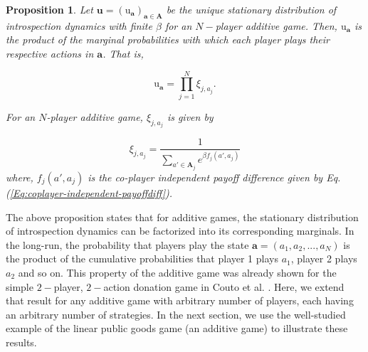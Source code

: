 \documentclass[11pt]{article}
\theoremstyle{plainCl1}
\newtheorem{Prop}{Proposition}
\theoremstyle{plainCl2}
\newcommand{\A}{\mathbf{A}}
\newcommand{\abf}{\mathbf{a}}
\newcommand{\ubf}{\mathbf{u}}
\begin{document}
\begin{Prop}
Let $\ubf = (\mathrm{u}_\abf)_{\abf \in \A}$ be the unique stationary distribution of introspection dynamics with finite $\beta$ for an $N-$player additive game. Then, $\mathrm{u}_\abf$ is the product of the marginal probabilities with which each player plays their respective actions in $\abf$. That is, 

\begin{equation}
\mathrm{u}_\abf = \prod_{j = 1}^N \xi_{j,a_j}.
\label{Eq:additive-game-products}
\end{equation}

\noindent For an $N$-player additive game, $\xi_{j,a_j}$ is given by

\begin{equation}
\xi_{j,a_j} = \frac{1}{\displaystyle \sum_{a' \in \A_j} e^{\beta f_j(a',a_j)}} 
\label{Eq:marginal-at-additive-game}
\end{equation}
\noindent where, $f_j(a', a_j)$ is the co-player independent payoff difference given by Eq. (\ref{Eq:coplayer-independent-payoffdiff}).
\label{Th:additive-game-product-of-marginals}
\end{Prop}
\noindent The above proposition states that for additive games, the stationary distribution of introspection dynamics can be factorized into its corresponding marginals. In the long-run, the probability that players play the state $\abf = (a_1, a_2, ...,a_N)$ is the product of the cumulative probabilities that player 1 plays $a_1$, player 2 plays $a_2$ and so on. This property of the additive game was already shown for the simple $2-$player, $2-$action donation game in Couto et al. \cite{Couto:NJP:2022}.  Here, we extend that result for any additive game with arbitrary number of players, each having an arbitrary number of strategies. In the next section, we use the well-studied example of the linear public goods game (an additive game) to illustrate these results.
\end{document}

